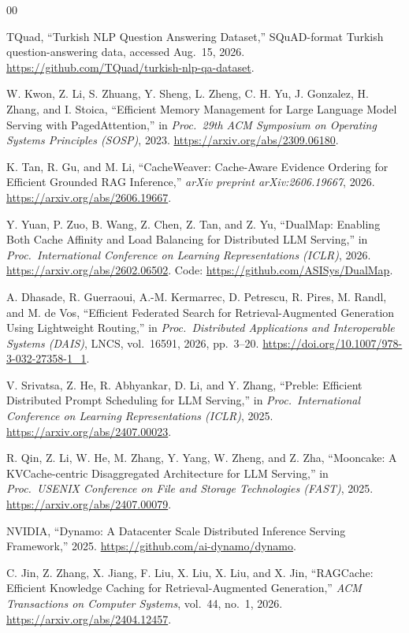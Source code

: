 \documentclass[conference]{IEEEtran}
\begin{document}
\begin{thebibliography}{00}

TQuad, ``Turkish NLP Question Answering Dataset,'' SQuAD-format Turkish
question-answering data, accessed Aug.\ 15, 2026.
\url{https://github.com/TQuad/turkish-nlp-qa-dataset}.

W. Kwon, Z. Li, S. Zhuang, Y. Sheng, L. Zheng, C. H. Yu, J. Gonzalez,
H. Zhang, and I. Stoica, ``Efficient Memory Management for Large
Language Model Serving with PagedAttention,'' in \emph{Proc.\ 29th
ACM Symposium on Operating Systems Principles (SOSP)}, 2023.
\url{https://arxiv.org/abs/2309.06180}.

K. Tan, R. Gu, and M. Li, ``CacheWeaver: Cache-Aware Evidence
Ordering for Efficient Grounded RAG Inference,'' \emph{arXiv preprint
arXiv:2606.19667}, 2026. \url{https://arxiv.org/abs/2606.19667}.

Y. Yuan, P. Zuo, B. Wang, Z. Chen, Z. Tan, and Z. Yu, ``DualMap:
Enabling Both Cache Affinity and Load Balancing for Distributed LLM
Serving,'' in \emph{Proc.\ International Conference on Learning
Representations (ICLR)}, 2026.
\url{https://arxiv.org/abs/2602.06502}.
Code: \url{https://github.com/ASISys/DualMap}.

A. Dhasade, R. Guerraoui, A.-M. Kermarrec, D. Petrescu, R. Pires,
M. Randl, and M. de Vos, ``Efficient Federated Search for
Retrieval-Augmented Generation Using Lightweight Routing,'' in
\emph{Proc.\ Distributed Applications and Interoperable Systems
(DAIS)}, LNCS, vol.~16591, 2026, pp.~3--20.
\url{https://doi.org/10.1007/978-3-032-27358-1_1}.

V. Srivatsa, Z. He, R. Abhyankar, D. Li, and Y. Zhang, ``Preble:
Efficient Distributed Prompt Scheduling for LLM Serving,'' in
\emph{Proc.\ International Conference on Learning Representations
(ICLR)}, 2025. \url{https://arxiv.org/abs/2407.00023}.

R. Qin, Z. Li, W. He, M. Zhang, Y. Yang, W. Zheng, and Z. Zha,
``Mooncake: A KVCache-centric Disaggregated Architecture for LLM
Serving,'' in \emph{Proc.\ USENIX Conference on File and Storage
Technologies (FAST)}, 2025. \url{https://arxiv.org/abs/2407.00079}.

NVIDIA, ``Dynamo: A Datacenter Scale Distributed Inference Serving
Framework,'' 2025. \url{https://github.com/ai-dynamo/dynamo}.

C. Jin, Z. Zhang, X. Jiang, F. Liu, X. Liu, X. Liu, and X. Jin,
``RAGCache: Efficient Knowledge Caching for Retrieval-Augmented
Generation,'' \emph{ACM Transactions on Computer Systems}, vol.~44,
no.~1, 2026. \url{https://arxiv.org/abs/2404.12457}.


\end{thebibliography}
\end{document}
